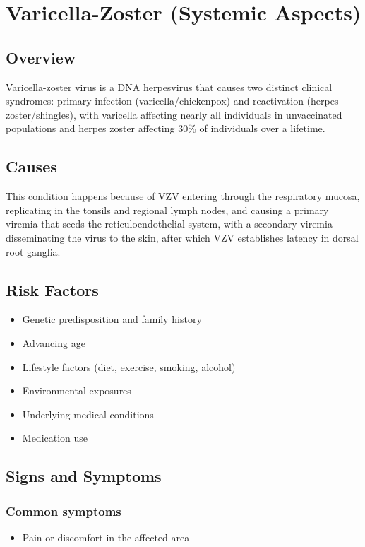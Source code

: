 \chapter{Varicella-Zoster (Systemic Aspects)}
\label{sec:Varicella-Zoster Systemic}

\section{Overview}
Varicella-zoster virus is a DNA herpesvirus that causes two distinct clinical syndromes: primary infection (varicella/chickenpox) and reactivation (herpes zoster/shingles), with varicella affecting nearly all individuals in unvaccinated populations and herpes zoster affecting 30\% of individuals over a lifetime.
\section{Causes}
This condition happens because of VZV entering through the respiratory mucosa, replicating in the tonsils and regional lymph nodes, and causing a primary viremia that seeds the reticuloendothelial system, with a secondary viremia disseminating the virus to the skin, after which VZV establishes latency in dorsal root ganglia.     
\section{Risk Factors}

\begin{itemize}[noitemsep]
  \item Genetic predisposition and family history
  \item Advancing age
  \item Lifestyle factors (diet, exercise, smoking, alcohol)
  \item Environmental exposures
  \item Underlying medical conditions
  \item Medication use
\end{itemize}
\section{Signs and Symptoms}

\subsection{Common symptoms}
\begin{itemize}[noitemsep]
  \item Pain or discomfort in the affected area
  \end{itemize}

